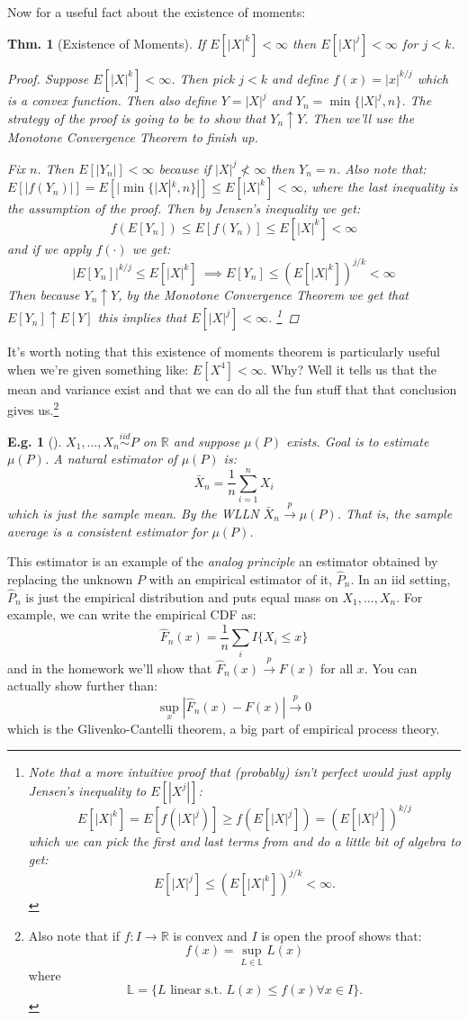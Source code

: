 \documentclass{tufte-book}
\theoremstyle{mytheoremstyle}
\newtheorem*{thm}{Thm.}
\theoremstyle{mylemstyle}
\theoremstyle{mydefstyle}
\newtheorem*{ex}{E.g.}
\begin{document}
Now for a useful fact about the existence of moments:
\begin{thm}[Existence of Moments] If \(E[|X|^k] < \infty\) then \(E[|X|^j] < \infty\) for \(j < k\). 
	\begin{proof}
		Suppose \(E[|X|^k] < \infty\). Then pick \(j < k\) and define \(f(x) = |x|^{k/j}\) which is a convex function. Then also define \(Y = |X|^j\) and \(Y_n = \min\{|X|^j, n\}\). The strategy of the proof is going to be to show that \(Y_n \uparrow Y\). Then we'll use the Monotone Convergence Theorem to finish up.
		
		Fix \(n\). Then \(E[|Y_n|] < \infty\) because if \(|X|^j \not < \infty\) then \(Y_n = n\). Also note that: \(E[|f(Y_n)|] = E[|\min\{|X|^k, n\}|] \le E[|X|^k] < \infty\), where the last inequality is the assumption of the proof. Then by Jensen's inequality we get:
			\[f(E[Y_n]) \le E[f(Y_n)] \le E[|X|^k] < \infty\]
		and if we apply \(f(\cdot)\) we get:
			\[|E[Y_n]|^{k/j} \le E[|X|^k]\ \implies E[Y_n] \le \left(E[|X|^k]\right)^{j/k} < \infty\]
		Then because \(Y_n \uparrow Y\), by the Monotone Convergence Theorem we get that \(E[Y_n] \uparrow E[Y]\) this implies that \(E[|X|^j] < \infty\). \footnote{Note that a more intuitive proof that (probably) isn't perfect would just apply Jensen's inequality to \(E[|X^j|]\):
			\[E[|X|^k] = E[f(|X|^j)] \ge f\left(E[|X|^j]\right) = \left(E[|X|^j]\right)^{k/j}\]
		which we can pick the first and last terms from and do a little bit of algebra to get:
			\[E[|X|^j] \le \left(E[|X|^k]\right)^{j/k} < \infty \text{.}\]	}
	\end{proof}
\end{thm}
It's worth noting that this existence of moments theorem is particularly useful when we're given something like: \(E[X^4] < \infty\). Why? Well it tells us that the mean and variance exist and that we can do all the fun stuff that that conclusion gives us.\footnote{Also note that if \(f: I \rightarrow \mathbb{R}\) is convex and \(I\) is open the proof shows that:
	\[f(x) = \sup_{L \in \mathbb{L}} L(x)\]
where \[\mathbb{L} = \{L \text{ linear s.t. } L(x) \le f(x) \forall x \in I\} \text{.}\]}

\begin{ex}[] \(X_1, \dots, X_n \overset{iid}{\sim} P\) on \(\mathbb{R}\) and suppose \(\mu(P)\) exists. Goal is to estimate \(\mu(P)\). A natural estimator of \(\mu(P)\) is:
	\[\bar{X}_n = \frac{1}{n} \sum_{i = 1}^n X_i\]
which is just the sample mean. By the WLLN \(\bar{X}_n \overset{p}{\rightarrow} \mu(P)\). That is, the sample average is a consistent estimator for \(\mu(P)\). 
\end{ex}
This estimator is an example of the \emph{analog principle} an estimator obtained by replacing the unknown \(P\) with an empirical estimator of it, \(\hat{P}_n\). In an iid setting, \(\hat{P}_n\) is just the empirical distribution and puts equal mass on \(X_1, \dots, X_n\). For example, we can write the empirical CDF as: 
	\[\hat{F}_n(x) = \frac{1}{n} \sum_i I\{X_i \le x\}\]
and in the homework we'll show that \(\hat{F}_n(x) \overset{p}{\rightarrow} F(x)\) for all \(x\). You can actually show further than:
	\[\sup_x |\hat{F}_n(x) - F(x)| \overset{p}{\rightarrow} 0\]
which is the Glivenko-Cantelli theorem, a big part of empirical process theory.
\end{document}

